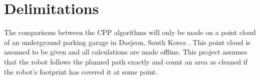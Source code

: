 \section{Delimitations}
\label{sec:delimitations}



The comparisons between the CPP algorithms will only be made on a point cloud of an underground parking garage in Daejeon, South Korea  \cite{jeong2019complex}. This point cloud is assumed to be given and all calculations are made offline. This project assumes that the robot follows the planned path exactly and count an area as cleaned if the robot's footprint has covered it at some point. 



